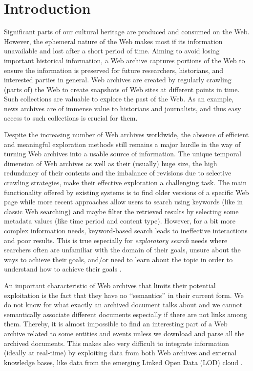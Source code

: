 \documentclass[runningheads,a4paper]{libtex/llncs}
\newcommand{\q}[1]{\lq\lq{}{}#1\rq\rq{}{}}
\begin{document}
\section{Introduction}

Significant parts of our cultural heritage are produced and consumed on the Web.
However, the ephemeral nature of the Web makes most if its information
unavailable and lost after a short period of time.
Aiming to avoid losing important historical information,
a Web archive captures portions of the Web to ensure the information
is preserved for future researchers, historians, and interested parties in general.
Web archives are created by regularly crawling (parts of) the Web
to create snapshots of Web sites at different points in time.
Such collections are valuable to explore the past of the Web.
As an example, news archives are of immense value to
historians and journalists,
and thus easy access to such collections
is crucial for them.

Despite the increasing number of Web archives worldwide,
the absence of efficient and meaningful exploration methods
still remains a major hurdle in the
way of turning Web archives into a usable source of information.
The unique temporal dimension of Web archives
as well as their (usually) huge size,
the high redundancy of their contents
and the imbalance of revisions due to selective crawling strategies,
make their effective exploration a challenging task.
The main functionality offered by existing systems is to find
older versions of a specific Web page
while more recent approaches allow users to search using keywords (like in classic Web searching)
and maybe filter the retrieved results by
selecting some metadata values (like time period and content type).
However, for a bit more complex information needs, keyword-based search
leads to ineffective interactions and poor results.
This is true especially for {\em exploratory search} needs
where searchers often
are unfamiliar with the domain of their goals, unsure about the ways to achieve their
goals, and/or need to learn about the topic in order to understand how to
achieve their goals \cite{marchionini2006exploratory}.

An important characteristic of Web archives that limits their potential exploitation
is the fact that they have no \q{semantics} in their current form.
We do not know for what exactly an archived document talks about
and we cannot semantically associate different documents
especially if there are not links among them.
Thereby, it is almost impossible to find an interesting part of a Web archive
related to some entities and events
unless we download and parse all the archived documents.
This makes also very difficult to integrate information (ideally at real-time)
by exploiting data from both Web archives
and external knowledge bases,
like data from the emerging Linked Open Data (LOD) cloud \cite{heath2011linked}.
\end{document}

